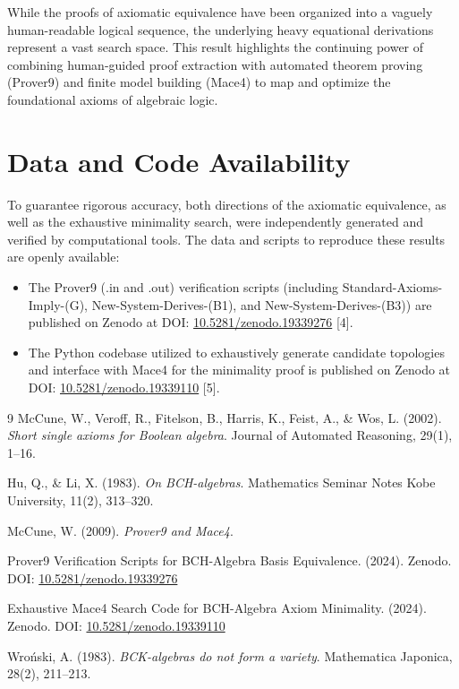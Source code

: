\documentclass[11pt, a4paper]{article}
\begin{document}
While the proofs of axiomatic equivalence have been organized into a vaguely human-readable logical sequence, the underlying heavy equational derivations represent a vast search space. This result highlights the continuing power of combining human-guided proof extraction with automated theorem proving (Prover9) and finite model building (Mace4) to map and optimize the foundational axioms of algebraic logic.

\section{Data and Code Availability}
To guarantee rigorous accuracy, both directions of the axiomatic equivalence, as well as the exhaustive minimality search, were independently generated and verified by computational tools. The data and scripts to reproduce these results are openly available:
\begin{itemize}
    \item The Prover9 (.in and .out) verification scripts (including Standard-Axioms-Imply-(G), New-System-Derives-(B1), and New-System-Derives-(B3)) are published on Zenodo at DOI: \href{https://doi.org/10.5281/zenodo.19339276}{10.5281/zenodo.19339276} [4].
    \item The Python codebase utilized to exhaustively generate candidate topologies and interface with Mace4 for the minimality proof is published on Zenodo at DOI: \href{https://doi.org/10.5281/zenodo.19339110}{10.5281/zenodo.19339110} [5].
\end{itemize}

\begin{thebibliography}{9}
    McCune, W., Veroff, R., Fitelson, B., Harris, K., Feist, A., \& Wos, L. (2002). \textit{Short single axioms for Boolean algebra}. Journal of Automated Reasoning, 29(1), 1--16.
    
    Hu, Q., \& Li, X. (1983). \textit{On BCH-algebras}. Mathematics Seminar Notes Kobe University, 11(2), 313--320.
    
    McCune, W. (2009). \textit{Prover9 and Mace4}.
    
    Prover9 Verification Scripts for BCH-Algebra Basis Equivalence. (2024). Zenodo. DOI: \href{https://doi.org/10.5281/zenodo.19339276}{10.5281/zenodo.19339276}
    
    Exhaustive Mace4 Search Code for BCH-Algebra Axiom Minimality. (2024). Zenodo. DOI: \href{https://doi.org/10.5281/zenodo.19339110}{10.5281/zenodo.19339110}
    
    Wroński, A. (1983). \textit{BCK-algebras do not form a variety}. Mathematica Japonica, 28(2), 211--213.
\end{thebibliography}
\end{document}
